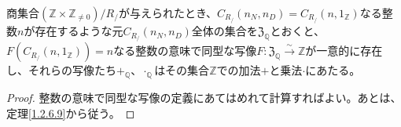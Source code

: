 \documentclass[dvipdfmx]{jsarticle}
\begin{document}
\begin{thm}\label{1.2.6.15}
商集合$\left( \mathbb{Z} \times \mathbb{Z}_{\neq 0} \right) /R_{/} $が与えられたとき、$C_{R_{/}}\left( n_{N},n_{D} \right) = C_{R_{/}}\left( n,1_{\mathbb{Z}} \right)$なる整数$n$が存在するような元$C_{R_{/}}\left( n_{N},n_{D} \right)$全体の集合を$\mathfrak{Z}_{\mathbb{Q}}$とおくと、$F\left( C_{R_{/}}\left( n,1_{\mathbb{Z}} \right) \right) = n$なる整数の意味で同型な写像$F:\mathfrak{Z}_{\mathbb{Q}}\overset{\sim}{\rightarrow}\mathbb{Z}$が一意的に存在し、それらの写像たち$+_{\mathbb{Q}}$、$\cdot_{\mathbb{Q}}$はその集合$\mathbb{Z}$での加法$+$と乗法$\cdot$にあたる。
\end{thm}
\begin{proof}
整数の意味で同型な写像の定義にあてはめれて計算すればよい。あとは、定理\ref{1.2.6.9}から従う。
\end{proof}
\end{document}
